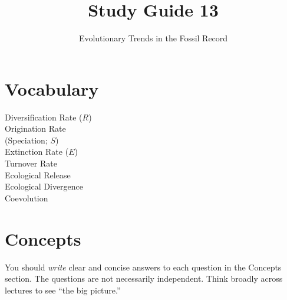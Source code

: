 \documentclass[letterpaper]{tufte-handout}
\title{Study Guide 13\hfill}
\author{Evolutionary Trends in the Fossil Record}
\date{} %
\begin{document}
\maketitle	%


\section{Vocabulary}
\vspace{-1\baselineskip}
\begin{multicols}{2}
Diversification Rate ($R$)\\
Origination Rate\\\hspace{1em}(Speciation; $S$)\\
Extinction Rate ($E$)\\
Turnover Rate\\
Ecological Release\\
Ecological Divergence\\
Coevolution
\end{multicols}

\section{Concepts}

You should \emph{write} clear and concise answers to each question in the Concepts section.  The questions are not necessarily independent.  Think broadly across lectures to see ``the big picture.'' 
\end{document}
